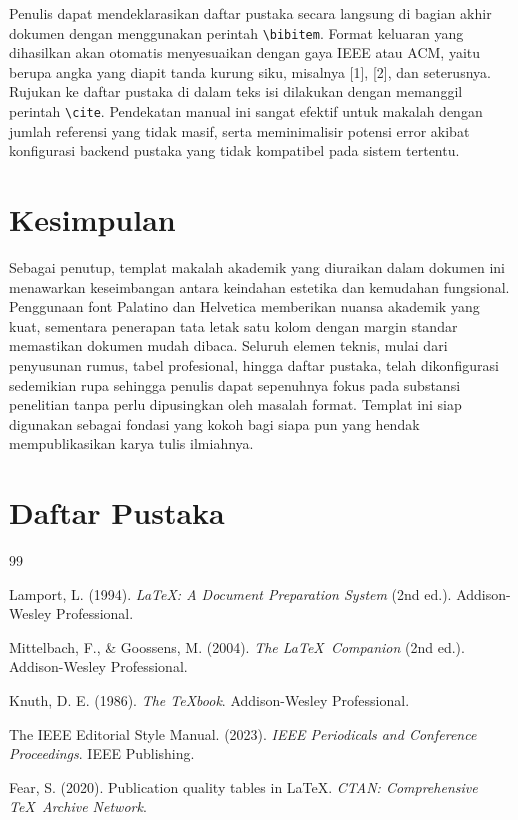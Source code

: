 \documentclass[11pt,a4paper]{article}
\begin{document}
	Penulis dapat mendeklarasikan daftar pustaka secara langsung di bagian akhir dokumen dengan menggunakan perintah \texttt{\textbackslash bibitem}. Format keluaran yang dihasilkan akan otomatis menyesuaikan dengan gaya IEEE atau ACM, yaitu berupa angka yang diapit tanda kurung siku, misalnya [1], [2], dan seterusnya. Rujukan ke daftar pustaka di dalam teks isi dilakukan dengan memanggil perintah \texttt{\textbackslash cite}. Pendekatan manual ini sangat efektif untuk makalah dengan jumlah referensi yang tidak masif, serta meminimalisir potensi error akibat konfigurasi backend pustaka yang tidak kompatibel pada sistem tertentu.
	
	\section{Kesimpulan}
	
	Sebagai penutup, templat makalah akademik yang diuraikan dalam dokumen ini menawarkan keseimbangan antara keindahan estetika dan kemudahan fungsional. Penggunaan font Palatino dan Helvetica memberikan nuansa akademik yang kuat, sementara penerapan tata letak satu kolom dengan margin standar memastikan dokumen mudah dibaca. Seluruh elemen teknis, mulai dari penyusunan rumus, tabel profesional, hingga daftar pustaka, telah dikonfigurasi sedemikian rupa sehingga penulis dapat sepenuhnya fokus pada substansi penelitian tanpa perlu dipusingkan oleh masalah format. Templat ini siap digunakan sebagai fondasi yang kokoh bagi siapa pun yang hendak mempublikasikan karya tulis ilmiahnya.
	
	\newpage
	\section*{Daftar Pustaka}
	
	\begin{thebibliography}{99}
		\raggedright
		
		Lamport, L. (1994). \textit{\LaTeX: A Document Preparation System} (2nd ed.). Addison-Wesley Professional.
		
		Mittelbach, F., \& Goossens, M. (2004). \textit{The \LaTeX\ Companion} (2nd ed.). Addison-Wesley Professional.
		
		Knuth, D. E. (1986). \textit{The \TeX book}. Addison-Wesley Professional.
		
		The IEEE Editorial Style Manual. (2023). \textit{IEEE Periodicals and Conference Proceedings}. IEEE Publishing.
		
		Fear, S. (2020). Publication quality tables in \LaTeX. \textit{CTAN: Comprehensive \TeX\ Archive Network}. 
		
	\end{thebibliography}
	
\end{document}
